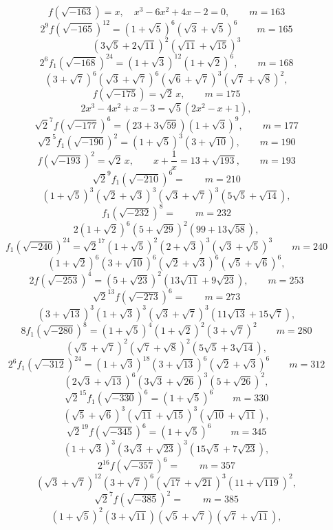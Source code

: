 
\[
f(\sqrt{-163}) = x,\quad x^3 - 6x^2 + 4x - 2 = 0, \qquad m = 163
\]
\[
2^9 f(\sqrt{-165})^{12} = (1+\sqrt5)^6(\sqrt3+\sqrt5)^6 \qquad m = 165
\]
\[
(3\sqrt5+2\sqrt{11})^2(\sqrt{11}+\sqrt{15})^3
\]
\[
2^6 f_1(\sqrt{-168})^{24} = (1+\sqrt3)^{12}(1+\sqrt2)^6, \qquad m = 168
\]
\[
(3+\sqrt7)^6(\sqrt3+\sqrt7)^6(\sqrt6+\sqrt7)^3(\sqrt7+\sqrt8)^2,
\]
\[
f(\sqrt{-175}) = \sqrt2\,x, \qquad m = 175
\]
\[
2x^3 - 4x^2 + x - 3 = \sqrt5(2x^2 - x + 1),
\]
\[
\sqrt2^{7} f(\sqrt{-177})^6 = (23+3\sqrt{59})(1+\sqrt3)^9, \qquad m = 177
\]
\[
\sqrt2^{5} f_1(\sqrt{-190})^2 = (1+\sqrt5)^3(3+\sqrt{10}), \qquad m = 190
\]
\[
f(\sqrt{-193})^2 = \sqrt2\,x, \qquad x + \frac1x = 13 + \sqrt{193}, \qquad m = 193
\]
\[
\sqrt2^{9} f_1(\sqrt{-210})^6 = \qquad m = 210
\]
\[
(1+\sqrt5)^3(\sqrt2+\sqrt3)^3(\sqrt3+\sqrt7)^3(5\sqrt5+\sqrt{14}),
\]
\[
f_1(\sqrt{-232})^8 = \qquad m = 232
\]
\[
2(1+\sqrt2)^6(5+\sqrt{29})^2(99+13\sqrt{58}),
\]
\[
f_1(\sqrt{-240})^{24} = \sqrt2^{17}(1+\sqrt5)^2(2+\sqrt3)^3(\sqrt3+\sqrt5)^3 \qquad m = 240
\]
\[
(1+\sqrt2)^6(3+\sqrt{10})^6(\sqrt2+\sqrt3)^6(\sqrt5+\sqrt6)^6,
\]
\[
2 f(\sqrt{-253})^4 = (5+\sqrt{23})^2(13\sqrt{11}+9\sqrt{23}), \qquad m = 253
\]
\[
\sqrt2^{13} f(\sqrt{-273})^6 = \qquad m = 273
\]
\[
(3+\sqrt{13})^3(1+\sqrt3)^3(\sqrt3+\sqrt7)^3(11\sqrt{13}+15\sqrt7),
\]
\[
8 f_1(\sqrt{-280})^8 = (1+\sqrt5)^4(1+\sqrt2)^2(3+\sqrt7)^2 \qquad m = 280
\]
\[
(\sqrt5+\sqrt7)^2(\sqrt7+\sqrt8)^2(5\sqrt5+3\sqrt{14}),
\]
\[
2^6 f_1(\sqrt{-312})^{24} = (1+\sqrt3)^{18}(3+\sqrt{13})^6(\sqrt2+\sqrt3)^6 \qquad m = 312
\]
\[
(2\sqrt3+\sqrt{13})^6(3\sqrt3+\sqrt{26})^3(5+\sqrt{26})^2,
\]
\[
\sqrt2^{15} f_1(\sqrt{-330})^6 = (1+\sqrt5)^6 \qquad m = 330
\]
\[
(\sqrt5+\sqrt6)^3(\sqrt{11}+\sqrt{15})^3(\sqrt{10}+\sqrt{11}),
\]
\[
\sqrt2^{19} f(\sqrt{-345})^6 = (1+\sqrt5)^6 \qquad m = 345
\]
\[
(1+\sqrt3)^3(3\sqrt3+\sqrt{23})^3(15\sqrt5+7\sqrt{23}),
\]
\[
2^{16} f(\sqrt{-357})^6 = \qquad m = 357
\]
\[
(\sqrt3+\sqrt7)^{12}(3+\sqrt7)^6(\sqrt{17}+\sqrt{21})^3(11+\sqrt{119})^2,
\]
\[
\sqrt2^{7} f(\sqrt{-385})^2 = \qquad m = 385
\]
\[
(1+\sqrt5)^2(3+\sqrt{11})(\sqrt5+\sqrt7)(\sqrt7+\sqrt{11}),
\]
